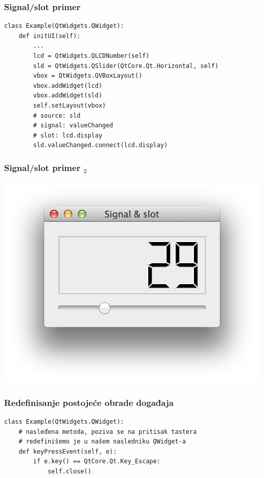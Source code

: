 \documentclass[utf8,compress]{beamer}
\begin{document}
\begin{frame}
  \frametitle{Signal/slot primer}
\begin{verbatim}
class Example(QtWidgets.QWidget):
    def initUI(self):
        ...
        lcd = QtWidgets.QLCDNumber(self)
        sld = QtWidgets.QSlider(QtCore.Qt.Horizontal, self)
        vbox = QtWidgets.QVBoxLayout()
        vbox.addWidget(lcd)
        vbox.addWidget(sld)
        self.setLayout(vbox)
        # source: sld
        # signal: valueChanged
        # slot: lcd.display
        sld.valueChanged.connect(lcd.display)
\end{verbatim}
\end{frame}

\begin{frame}[fragile]
  \frametitle{Signal/slot primer $_2$}
\begin{center}
\includegraphics[scale=0.5]{pyqt10.png}
\end{center}
\end{frame}

\begin{frame}[fragile]
  \frametitle{Redefinisanje postojeće obrade događaja}
\begin{verbatim}
class Example(QtWidgets.QWidget):
    # nasleđena metoda, poziva se na pritisak tastera
    # redefinišemo je u našem nasledniku QWidget-a
    def keyPressEvent(self, e):
        if e.key() == QtCore.Qt.Key_Escape:
            self.close() 
\end{verbatim}
\end{frame}
\end{document}
